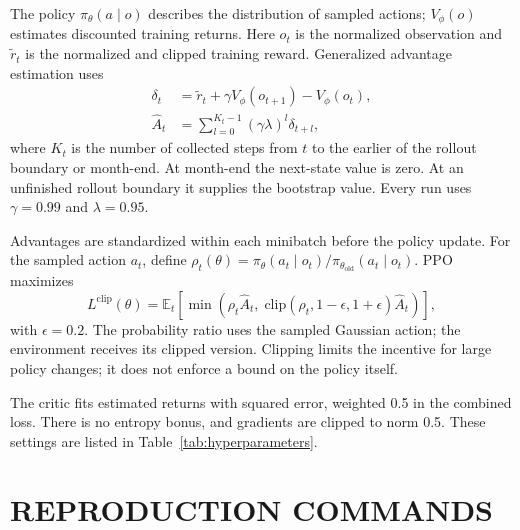 \documentclass{UNCC-thesis}
\begin{document}
The policy \(\pi_\theta(a\mid o)\) describes the distribution of sampled actions;
\(V_\phi(o)\) estimates discounted training returns. Here \(o_t\) is the
normalized observation and \(\widetilde r_t\) is the normalized and clipped
training reward. Generalized advantage estimation uses
\begin{align}
  \delta_t
  &=\widetilde r_t+\gamma V_\phi(o_{t+1})-V_\phi(o_t),
  \label{eq:td-error}\\
  \hat A_t
  &=\sum_{l=0}^{K_t-1}(\gamma\lambda)^l\delta_{t+l},
  \label{eq:gae}
\end{align}
where \(K_t\) is the number of collected steps from \(t\) to the earlier of
the rollout boundary or month-end. At month-end the next-state value is
zero. At an unfinished rollout boundary it supplies the bootstrap value.
Every run uses \(\gamma=0.99\) and \(\lambda=0.95\).

Advantages are standardized within each minibatch before the policy update.
For the sampled action \(a_t\), define
\(\rho_t(\theta)=\pi_\theta(a_t\mid o_t)/
\pi_{\theta_{\mathrm{old}}}(a_t\mid o_t)\). PPO maximizes
\begin{equation}
  L^{\mathrm{clip}}(\theta)
  =\mathbb E_t\!\left[
    \min\!\left(
      \rho_t\hat A_t,\;
      \mathrm{clip}(\rho_t,1-\epsilon,1+\epsilon)\hat A_t
    \right)
  \right],
  \label{eq:ppo-clip}
\end{equation}
with \(\epsilon=0.2\). The probability ratio uses the sampled Gaussian
action; the environment receives its clipped version. Clipping limits the
incentive for large policy changes; it does not enforce a bound on the
policy itself.

The critic fits estimated returns with squared error, weighted 0.5
in the combined loss. There is no entropy bonus, and gradients are clipped
to norm 0.5. These settings are listed in Table~\ref{tab:hyperparameters}.

\chapter{REPRODUCTION COMMANDS}
\label{app:reproduction}
\end{document}
